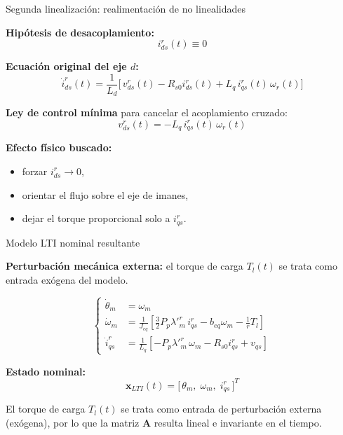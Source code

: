 \documentclass[aspectratio=169,t]{beamer}
\begin{document}
\begin{frame}{Segunda linealización: realimentación de no linealidades}
\vspace{3mm}

\textbf{Hipótesis de desacoplamiento:}
\begin{equation*}
i_{ds}^{r}(t)\equiv 0
\end{equation*}

\textbf{Ecuación original del eje $d$:}
\begin{equation*}
\dot{i}_{ds}^{r}(t)=\frac{1}{L_d}\Big[\,v_{ds}^{r}(t)-R_{s0}i_{ds}^{r}(t)+L_q\,i_{qs}^{r}(t)\,\omega_r(t)\Big]
\end{equation*}

\textbf{Ley de control mínima} para cancelar el acoplamiento cruzado:
\begin{equation*}
\boxed{\;v_{ds}^{r}(t)=-L_q\,i_{qs}^{r}(t)\,\omega_r(t)\;}
\end{equation*}

\textbf{Efecto físico buscado:}
\begin{itemize}
  \item forzar $i_{ds}^{r}\to 0$,
  \item orientar el flujo sobre el eje de imanes,
  \item dejar el torque proporcional solo a $i_{qs}^{r}$.
\end{itemize}
\end{frame}

\begin{frame}{Modelo LTI nominal resultante}
\vspace{2mm}

\textbf{Perturbación mecánica externa:} el torque de carga $T_l(t)$ se trata como entrada exógena del modelo.

\footnotesize
\begin{equation*}
\left\{
\begin{aligned}
\dot{\theta}_m &= \omega_m \\[2pt]
\dot{\omega}_m &= \frac{1}{J_{eq}}\!\left[\frac{3}{2}P_p\lambda'^r_m\,i_{qs}^r-b_{eq}\omega_m-\frac{1}{r}T_l\right] \\[4pt]
\dot{i}_{qs}^r &= \frac{1}{L_q}\!\left[-P_p\lambda'^r_m\,\omega_m-R_{s0}i_{qs}^r+v_{qs}\right]
\end{aligned}
\right.
\end{equation*}
\normalsize

\textbf{Estado nominal:}
\begin{equation*}
\bm{x}_{LTI}(t)=\big[\,\theta_m,\;\omega_m,\;i_{qs}^r\,\big]^T
\end{equation*}

{\small El torque de carga $T_l(t)$ se trata como entrada de perturbación externa (exógena), por lo que la matriz $\bm{A}$ resulta lineal e invariante en el tiempo.}
\end{frame}
\end{document}
